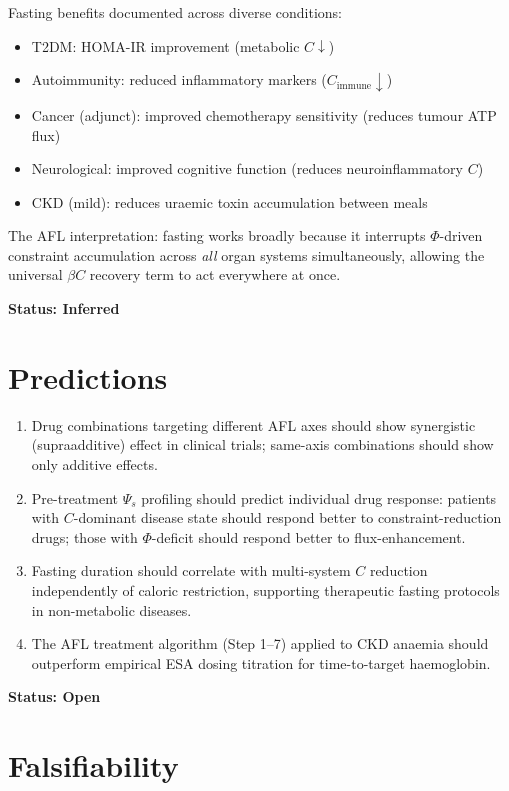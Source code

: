 \documentclass[12pt,a4paper]{article}
\begin{document}
Fasting benefits documented across diverse conditions:
\begin{itemize}
    \item T2DM: HOMA-IR improvement (metabolic $C \downarrow$)
    \item Autoimmunity: reduced inflammatory markers ($C_{\mathrm{immune}} \downarrow$)
    \item Cancer (adjunct): improved chemotherapy sensitivity (reduces tumour ATP flux)
    \item Neurological: improved cognitive function (reduces neuroinflammatory $C$)
    \item CKD (mild): reduces uraemic toxin accumulation between meals
\end{itemize}

The AFL interpretation: fasting works broadly because it interrupts $\Phi$-driven constraint accumulation across \textit{all} organ systems simultaneously, allowing the universal $\beta C$ recovery term to act everywhere at once.

\textbf{Status: Inferred}

\section{Predictions}

\begin{enumerate}
    \item Drug combinations targeting different AFL axes should show synergistic (supraadditive) effect in clinical trials; same-axis combinations should show only additive effects.
    \item Pre-treatment $\Psi_s$ profiling should predict individual drug response: patients with $C$-dominant disease state should respond better to constraint-reduction drugs; those with $\Phi$-deficit should respond better to flux-enhancement.
    \item Fasting duration should correlate with multi-system $C$ reduction independently of caloric restriction, supporting therapeutic fasting protocols in non-metabolic diseases.
    \item The AFL treatment algorithm (Step 1--7) applied to CKD anaemia should outperform empirical ESA dosing titration for time-to-target haemoglobin.
\end{enumerate}

\textbf{Status: Open}

\section{Falsifiability}
\end{document}
